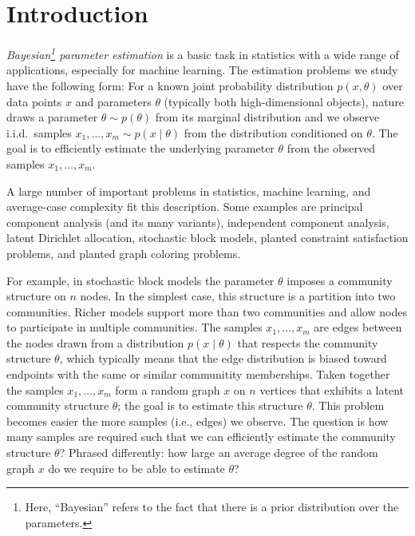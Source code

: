 %

\section{Introduction}

\Dnote{}

%
\emph{Bayesian\footnote{Here, ``Bayesian'' refers to the fact that there is a prior distribution over the parameters.} parameter estimation} \cite{wiki:Bayes_estimator} is a basic task in statistics with a wide range of applications, especially for machine learning.
The estimation problems we study have the following form:
For a known joint probability distribution $p(x,\theta)$ over data points $x$ and parameters $\theta$ (typically both high-dimensional objects), nature draws a parameter $\theta\sim p(\theta)$ from its marginal distribution and we observe i.i.d.~samples $x_1,\ldots,x_m \sim p(x\mid \theta)$ from the distribution conditioned on $\theta$.
The goal is to efficiently estimate the underlying parameter $\theta$ from the observed samples $x_1,\ldots,x_m$.

%
A large number of important problems in statistics, machine learning, and average-case complexity fit this description.
Some examples are principal component analysis (and its many variants), independent component analysis, latent Dirichlet allocation, stochastic block models, planted constraint satisfaction problems, and planted graph coloring problems.

%
For example, in stochastic block models the parameter $\theta$ imposes a community structure on $n$ nodes.
In the simplest case, this structure is a partition into two communities.
Richer models support more than two communities and allow nodes to participate in multiple communities.
The samples $x_1,\ldots,x_m$ are edges between the nodes drawn from a distribution $p(x\mid \theta)$ that respects the community structure $\theta$, which typically means that the edge distribution is biased toward endpoints with the same or similar communitity memberships.
Taken together the samples $x_1,\ldots,x_m$ form a random graph $x$ on $n$ vertices that exhibits a latent community structure $\theta$; the goal is to estimate this structure $\theta$.
This problem becomes easier the more samples (i.e., edges) we observe.
The question is how many samples are required such that we can efficiently estimate the community structure $\theta$?
Phrased differently:
how large an average degree of the random graph $x$ do we require to be able to estimate $\theta$?

